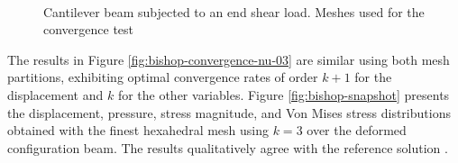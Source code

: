 \documentclass[english,11pt,3p,number,sort&compress]{elsarticle}
\begin{document}
\begin{figure}[H]
	\centering
	 \\
	\caption{Cantilever beam subjected to an end shear load. Meshes used for the convergence test}
	\label{fig:bishop-meshes}
\end{figure}

The results in Figure \ref{fig:bishop-convergence-nu-03} are similar using both mesh partitions, exhibiting optimal convergence rates of order $k+1$ for the displacement and $k$ for the other variables. Figure \ref{fig:bishop-snapshot} presents the displacement, pressure, stress magnitude, and Von Mises stress distributions obtained with the finest hexahedral mesh using $k=3$ over the deformed configuration beam. The results qualitatively agree with the reference solution \cite{bishop2014displacement}.
\end{document}
